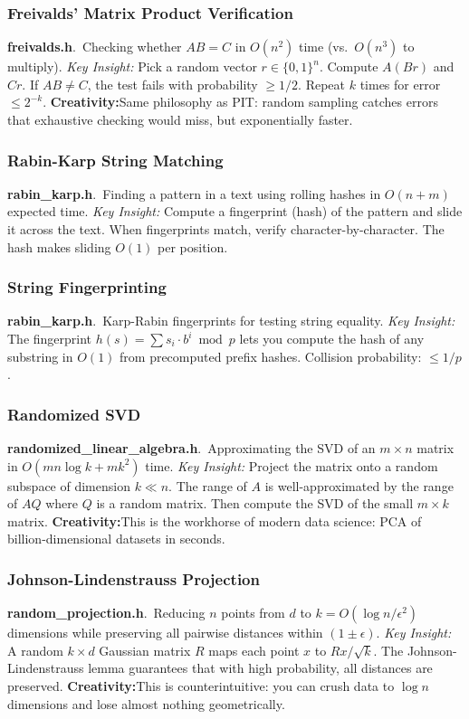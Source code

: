 \documentclass[11pt,a4paper]{article}
\newcommand{\algo}[2]{\textbf{#1}.\ #2}
\newcommand{\insight}{\textit{Key Insight: }}
\newcommand{\creative}{\textcolor{orange!80!black}{\textbf{Creativity:}}}
\begin{document}
\subsubsection{Freivalds' Matrix Product Verification}
\algo{freivalds.h}{Checking whether \(AB = C\) in \(O(n^2)\) time (vs.\ \(O(n^3)\) to multiply).}
\insight Pick a random vector \(r \in \{0,1\}^n\). Compute \(A(Br)\) and \(Cr\). If \(AB \ne C\), the test fails with probability \(\ge 1/2\). Repeat \(k\) times for error \(\le 2^{-k}\).
\creative Same philosophy as PIT: random sampling catches errors that exhaustive checking would miss, but exponentially faster.

\subsubsection{Rabin-Karp String Matching}
\algo{rabin\_karp.h}{Finding a pattern in a text using rolling hashes in \(O(n + m)\) expected time.}
\insight Compute a fingerprint (hash) of the pattern and slide it across the text. When fingerprints match, verify character-by-character. The hash makes sliding \(O(1)\) per position.

\subsubsection{String Fingerprinting}
\algo{rabin\_karp.h}{Karp-Rabin fingerprints for testing string equality.}
\insight The fingerprint \(h(s) = \sum s_i \cdot b^i \bmod p\) lets you compute the hash of any substring in \(O(1)\) from precomputed prefix hashes. Collision probability: \(\le 1/p\).

\subsubsection{Randomized SVD}
\algo{randomized\_linear\_algebra.h}{Approximating the SVD of an \(m \times n\) matrix in \(O(mn \log k + mk^2)\) time.}
\insight Project the matrix onto a random subspace of dimension \(k \ll n\). The range of \(A\) is well-approximated by the range of \(AQ\) where \(Q\) is a random matrix. Then compute the SVD of the small \(m \times k\) matrix.
\creative This is the workhorse of modern data science: PCA of billion-dimensional datasets in seconds.

\subsubsection{Johnson-Lindenstrauss Projection}
\algo{random\_projection.h}{Reducing \(n\) points from \(d\) to \(k = O(\log n / \epsilon^2)\) dimensions while preserving all pairwise distances within \((1 \pm \epsilon)\).}
\insight A random \(k \times d\) Gaussian matrix \(R\) maps each point \(x\) to \(Rx/\sqrt{k}\). The Johnson-Lindenstrauss lemma guarantees that with high probability, all distances are preserved.
\creative This is counterintuitive: you can crush data to \(\log n\) dimensions and lose almost nothing geometrically.
\end{document}
